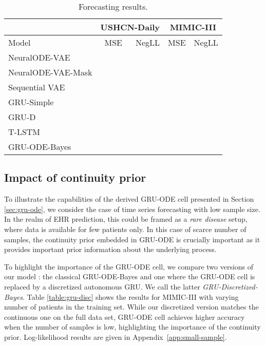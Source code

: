 \documentclass{article}
\newcommand{\method}{GRU-ODE-Bayes}
\begin{document}
\begin{table}[htb]
\caption{Forecasting results.}
\label{table:forecast}
\vskip 0.15in
\begin{center}
\begin{small}
\begin{sc}
\begin{tabular}{lrr|rr}
\toprule
& \multicolumn{2}{c}{USHCN-Daily} & \multicolumn{2}{c}{MIMIC-III} \\
\midrule
Model & MSE & NegLL & MSE & NegLL \\
\midrule
NeuralODE-VAE   &        &  &  &  \\
NeuralODE-VAE-Mask &  &  &  &   \\
Sequential VAE &  &  &  & \\
GRU-Simple  &   &  &   & \\
GRU-D  &   &   &   & \\
T-LSTM &  &  &  & \\
\hline
GRU-ODE-Bayes     &   &    &   & \\

\bottomrule
\end{tabular}
\end{sc}
\end{small}
\end{center}
\vskip -0.1in
\end{table}

\subsection{Impact of continuity prior}
\label{sec:continuity}
To illustrate the capabilities of the derived GRU-ODE cell presented in Section \ref{sec:gru-ode}, we consider the case of time series forecasting with low sample size. In the realm of EHR prediction, this could be framed as a \emph{rare disease} setup, where data is available for few patients only. In this case of scarce number of samples, the continuity prior embedded in GRU-ODE is crucially important as it provides important prior information about the underlying process.

To highlight the importance of the GRU-ODE cell, we compare two versions of our model : the classical \method{} and one where the GRU-ODE cell is replaced by a discretized autonomous GRU. We call the latter \emph{GRU-Discretized-Bayes}. Table \ref{table:gru-disc} shows the results for MIMIC-III with varying number of patients in the training set. While our discretized version matches the continuous one on the full data set, GRU-ODE cell achieves higher accuracy when the number of samples is low, highlighting the importance of the continuity prior. Log-likelihood results are given in Appendix~\ref{app:small-sample}.
\end{document}

